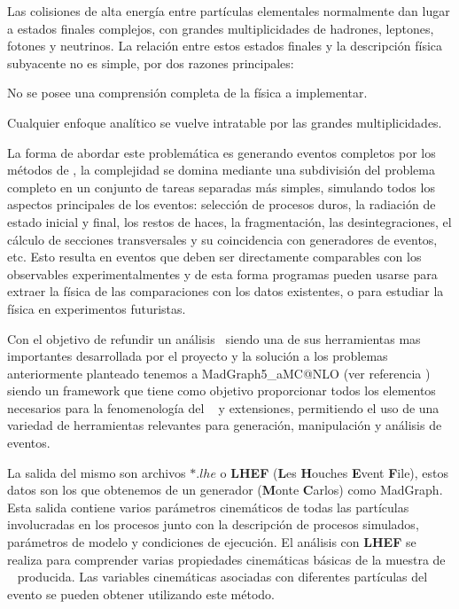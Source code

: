 Las colisiones de alta energía entre partículas elementales normalmente dan lugar a estados finales complejos, con grandes multiplicidades de hadrones, leptones, fotones y neutrinos. La relación entre estos estados finales y la descripción física subyacente no es simple, por dos razones principales:
\begin{itemize_f}
\item[-] No se posee una comprensión completa de la física a implementar.
\item[-] Cualquier enfoque analítico se vuelve intratable por las grandes multiplicidades.
\end{itemize_f}

La forma de abordar este problemática es generando eventos completos por los métodos de \MC, la complejidad se domina mediante una subdivisión del problema completo en un conjunto de tareas separadas más simples, simulando todos los aspectos principales de los eventos: selección de procesos duros, la radiación de estado inicial y final, los restos de haces, la fragmentación, las desintegraciones, el cálculo de secciones transversales y su coincidencia con generadores de eventos, etc. Esto resulta en eventos que deben ser directamente comparables con los observables experimentalmentes y de esta forma programas pueden usarse para extraer la física de las comparaciones con los datos existentes, o para estudiar la física en experimentos futuristas.

Con el objetivo de refundir un análisis \LHC ~siendo una de sus herramientas mas importantes desarrollada por el proyecto y la solución a los problemas anteriormente planteado tenemos a MadGraph5\_aMC@NLO (ver referencia \cite{alwall_automated_2014}) siendo un framework que tiene como objetivo proporcionar todos los elementos necesarios para la fenomenología del \ME ~ y extensiones, permitiendo el uso de una variedad de herramientas relevantes para generación, manipulación y análisis de eventos. 


La salida del mismo son archivos $*.lhe$ o \textbf{LHEF} (\textbf{L}es \textbf{H}ouches \textbf{E}vent \textbf{F}ile), estos datos son los que obtenemos de un generador \MC (\textbf{M}onte \textbf{C}arlos) como MadGraph. Esta salida contiene varios parámetros cinemáticos de todas las partículas involucradas en los procesos junto con la descripción de procesos simulados, parámetros de modelo y condiciones de ejecución. El análisis con \textbf{LHEF} se realiza para comprender varias propiedades cinemáticas básicas de la muestra de \MC ~ producida. Las variables cinemáticas asociadas con diferentes partículas del evento se pueden obtener utilizando este método.


